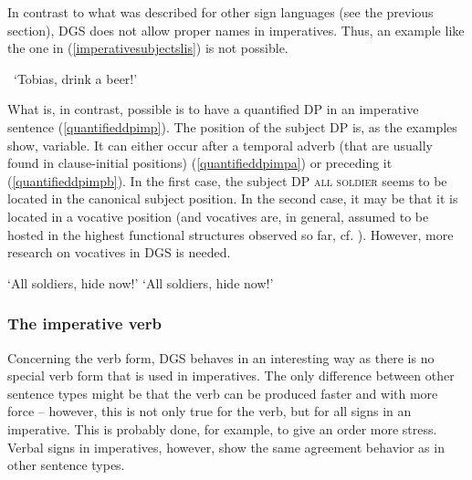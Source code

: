 \noindent In contrast to what was described for other sign languages (see the previous section), DGS does not allow proper names in imperatives. Thus, an example like the one in (\ref{imperativesubjectslis}) is not possible.


\begin{exe}
\ex *
\glt \textcolor{white}{*}`Tobias, drink a beer!' \label{imperativesubjectslis}
\end{exe}

\noindent What is, in contrast, possible is to have a quantified DP in an imperative sentence (\ref{quantifieddpimp}). The position of the subject DP is, as the examples show, variable. It can either occur after a temporal adverb (that are usually found in clause-initial positions) (\ref{quantifieddpimpa}) or preceding it (\ref{quantifieddpimpb}). In the first case, the subject DP \textsc{all soldier} seems to be located in the canonical subject position. In the second case, it may be that it is located in a vocative position (and vocatives are, in general, assumed to be hosted in the highest functional structures observed so far, cf. \citealt{moro2003notes, hill2007vocatives, hill2013vocatives}). However, more research on vocatives in DGS is needed. 

\begin{exe}
\ex\label{quantifieddpimp}\begin{xlist}
\ex {}
%
\glt `All soldiers, hide now!' \label{quantifieddpimpa}
\ex {}
%
\glt `All soldiers, hide now!' \label{quantifieddpimpb}
\end{xlist}
\end{exe}

\subsubsection{The imperative verb}
\noindent Concerning the verb form, DGS behaves in an interesting way as there is no special verb form that is used in imperatives. The only difference between other sentence types might be that the verb can be produced  faster and with more force -- however, this is not only true for the verb, but for all signs in an imperative. This is probably done, for example, to give an order more stress. Verbal signs in imperatives, however, show the same agreement behavior as in other sentence types. 

